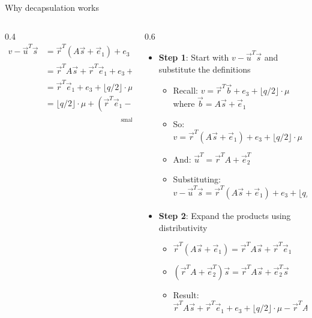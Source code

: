 \ifdefined\PRESENTATION\else\PassOptionsToClass{handout}{beamer}\fi\documentclass[aspectratio=169, lualatex]{beamer}
\begin{document}
\begin{frame}{Why decapsulation works}
	\begin{columns}[c]
		\begin{column}{0.4\textwidth}
			\tiny
			\begin{align*}
				v - \vec{u}^T\vec{s} & = \vec{r}^{T}(A\vec{s} + \vec{e}_1) + e_3 + \lfloor q/2 \rfloor \cdot \mu - (\vec{r}^{T}A + \vec{e}_{2}^{T})\vec{s}               \\
				                     & = \vec{r}^{T}A\vec{s} + \vec{r}^{T}\vec{e}_1 + e_3 + \lfloor q/2 \rfloor \cdot \mu - \vec{r}^{T}A\vec{s} - \vec{e}_{2}^{T}\vec{s} \\
				                     & = \vec{r}^{T}\vec{e}_{1} + e_3 + \lfloor q/2 \rfloor \cdot \mu - \vec{e}_{2}^{T}\vec{s}                                           \\
				                     & = \lfloor q/2 \rfloor \cdot \mu + \underbrace{(\vec{r}^{T}\vec{e}_{1} - \vec{e}_{2}^{T}\vec{s} + e_3)}_{\text{small error}}
			\end{align*}
		\end{column}
		\begin{column}{0.6\textwidth}
			\begin{itemize}
				\item \textbf{Step 1}: Start with $v - \vec{u}^T\vec{s}$ and substitute the definitions
				      \begin{itemize}
					      \item Recall: $v = \vec{r}^T\vec{b} + e_3 + \lfloor q/2 \rfloor \cdot \mu$ where $\vec{b} = A\vec{s} + \vec{e}_1$
					      \item So: $v = \vec{r}^T(A\vec{s} + \vec{e}_1) + e_3 + \lfloor q/2 \rfloor \cdot \mu$
					      \item And: $\vec{u}^T = \vec{r}^TA + \vec{e}_2^T$
					      \item Substituting: $v - \vec{u}^T\vec{s} = \vec{r}^T(A\vec{s} + \vec{e}_1) + e_3 + \lfloor q/2 \rfloor \cdot \mu - (\vec{r}^TA + \vec{e}_2^T)\vec{s}$
				      \end{itemize}
				\item \textbf{Step 2}: Expand the products using distributivity
				      \begin{itemize}
					      \item $\vec{r}^T(A\vec{s} + \vec{e}_1) = \vec{r}^TA\vec{s} + \vec{r}^T\vec{e}_1$
					      \item $(\vec{r}^TA + \vec{e}_2^T)\vec{s} = \vec{r}^TA\vec{s} + \vec{e}_2^T\vec{s}$
					      \item Result: $\vec{r}^TA\vec{s} + \vec{r}^T\vec{e}_1 + e_3 + \lfloor q/2 \rfloor \cdot \mu - \vec{r}^TA\vec{s} - \vec{e}_2^T\vec{s}$
				      \end{itemize}
			\end{itemize}
		\end{column}
	\end{columns}
\end{frame}
\end{document}
